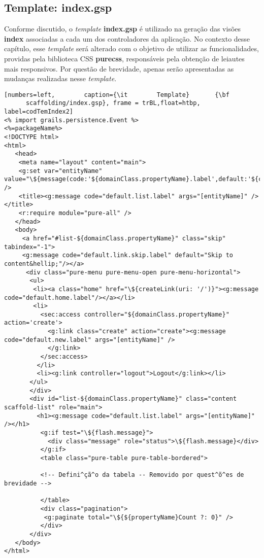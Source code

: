 \newpage

\subsection{Template: index.gsp}

\vspace{0.5cm}

Conforme discutido, o {\it template}  {\bf index.gsp} é utilizado na geração das
visões  {\bf index} associadas  a cada  um dos  controladores da  aplicação.  No
contexto desse  capítulo, esse  {\it template} será  alterado com o  objetivo de
utilizar  as  funcionalidades,  providas  pela  biblioteca  CSS  {\bf  purecss},
responsáveis  pela  obtenção  de  leiautes  mais  responsivos.  Por  questão  de
brevidade,  apenas   serão  apresentadas  as  mudanças   realizadas  nesse  {\it
  template}.  

\begin{lstlisting}[numbers=left,        caption={\it        Template}       {\bf
      scaffolding/index.gsp}, frame = trBL,float=htbp, label=codTemIndex2] 
<% import grails.persistence.Event %>
<%=packageName%>
<!DOCTYPE html>
<html>
   <head>
    <meta name="layout" content="main">
    <g:set var="entityName" value="\${message(code:'${domainClass.propertyName}.label',default:'${className}')}" />
    <title><g:message code="default.list.label" args="[entityName]" /></title>
    <r:require module="pure-all" />
   </head>
   <body>
     <a href="#list-${domainClass.propertyName}" class="skip" tabindex="-1">
     <g:message code="default.link.skip.label" default="Skip to content&hellip;"/></a>
      <div class="pure-menu pure-menu-open pure-menu-horizontal">
       <ul>
        <li><a class="home" href="\${createLink(uri: '/')}"><g:message code="default.home.label"/></a></li>
        <li>
          <sec:access controller="${domainClass.propertyName}" action='create'>
            <g:link class="create" action="create"><g:message code="default.new.label" args="[entityName]" />
            </g:link>
          </sec:access>
         </li>
         <li><g:link controller="logout">Logout</g:link></li> 
       </ul>
       </div>
       <div id="list-${domainClass.propertyName}" class="content scaffold-list" role="main">
         <h1><g:message code="default.list.label" args="[entityName]" /></h1>
          <g:if test="\${flash.message}">
            <div class="message" role="status">\${flash.message}</div>
          </g:if>
          <table class="pure-table pure-table-bordered">
          
          <!-- Defini^çã^o da tabela -- Removido por quest^õ^es de brevidade --> 

          </table>
          <div class="pagination">
           <g:paginate total="\${${propertyName}Count ?: 0}" />
          </div>
       </div>
   </body>
</html>
\end{lstlisting}

